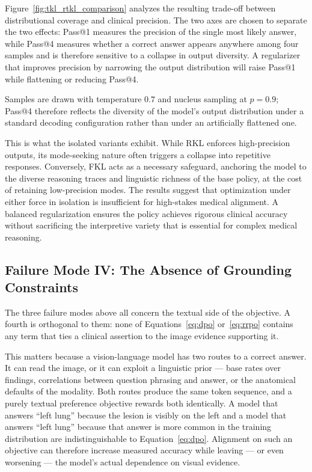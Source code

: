 Figure~\ref{fig:tkl_rtkl_comparison} analyzes the resulting trade-off between distributional coverage and clinical precision. The two axes are chosen to separate the two effects: Pass@1 measures the precision of the single most likely answer, while Pass@4 measures whether a correct answer appears anywhere among four samples and is therefore sensitive to a collapse in output diversity. A regularizer that improves precision by narrowing the output distribution will raise Pass@1 while flattening or reducing Pass@4.

Samples are drawn with temperature $0.7$ and nucleus sampling at $p = 0.9$; Pass@4 therefore reflects the diversity of the model's output distribution under a standard decoding configuration rather than under an artificially flattened one.

This is what the isolated variants exhibit. While RKL enforces high-precision outputs, its mode-seeking nature often triggers a collapse into repetitive responses. Conversely, FKL acts as a necessary safeguard, anchoring the model to the diverse reasoning traces and linguistic richness of the base policy, at the cost of retaining low-precision modes. The results suggest that optimization under either force in isolation is insufficient for high-stakes medical alignment. A balanced regularization ensures the policy achieves rigorous clinical accuracy without sacrificing the interpretive variety that is essential for complex medical reasoning.

\subsection{Failure Mode IV: The Absence of Grounding Constraints}
\label{sec:ana:grounding}

The three failure modes above all concern the textual side of the objective. A fourth is orthogonal to them: none of Equations~\ref{eq:dpo} or~\ref{eq:rrpo} contains any term that ties a clinical assertion to the image evidence supporting it.

This matters because a vision-language model has two routes to a correct answer. It can read the image, or it can exploit a linguistic prior --- base rates over findings, correlations between question phrasing and answer, or the anatomical defaults of the modality. Both routes produce the same token sequence, and a purely textual preference objective rewards both identically. A model that answers ``left lung'' because the lesion is visibly on the left and a model that answers ``left lung'' because that answer is more common in the training distribution are indistinguishable to Equation~\ref{eq:dpo}. Alignment on such an objective can therefore increase measured accuracy while leaving --- or even worsening --- the model's actual dependence on visual evidence.

